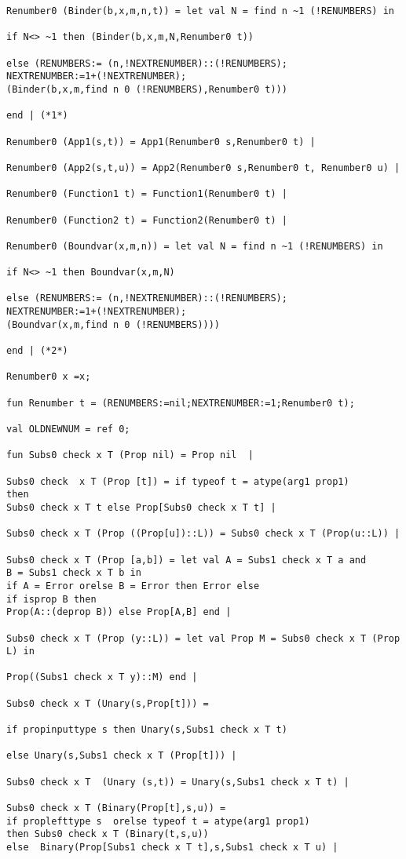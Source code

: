 \documentclass{article}
\begin{document}
{{\begin{verbatim}
Renumber0 (Binder(b,x,m,n,t)) = let val N = find n ~1 (!RENUMBERS) in

if N<> ~1 then (Binder(b,x,m,N,Renumber0 t))

else (RENUMBERS:= (n,!NEXTRENUMBER)::(!RENUMBERS);
NEXTRENUMBER:=1+(!NEXTRENUMBER);
(Binder(b,x,m,find n 0 (!RENUMBERS),Renumber0 t))) 

end | (*1*)

Renumber0 (App1(s,t)) = App1(Renumber0 s,Renumber0 t) |

Renumber0 (App2(s,t,u)) = App2(Renumber0 s,Renumber0 t, Renumber0 u) |

Renumber0 (Function1 t) = Function1(Renumber0 t) |

Renumber0 (Function2 t) = Function2(Renumber0 t) |

Renumber0 (Boundvar(x,m,n)) = let val N = find n ~1 (!RENUMBERS) in

if N<> ~1 then Boundvar(x,m,N)

else (RENUMBERS:= (n,!NEXTRENUMBER)::(!RENUMBERS);
NEXTRENUMBER:=1+(!NEXTRENUMBER);
(Boundvar(x,m,find n 0 (!RENUMBERS)))) 

end | (*2*)

Renumber0 x =x;

fun Renumber t = (RENUMBERS:=nil;NEXTRENUMBER:=1;Renumber0 t);

val OLDNEWNUM = ref 0;

fun Subs0 check x T (Prop nil) = Prop nil  |

Subs0 check  x T (Prop [t]) = if typeof t = atype(arg1 prop1)
then
Subs0 check x T t else Prop[Subs0 check x T t] |

Subs0 check x T (Prop ((Prop[u])::L)) = Subs0 check x T (Prop(u::L)) |

Subs0 check x T (Prop [a,b]) = let val A = Subs1 check x T a and
B = Subs1 check x T b in 
if A = Error orelse B = Error then Error else
if isprop B then
Prop(A::(deprop B)) else Prop[A,B] end |

Subs0 check x T (Prop (y::L)) = let val Prop M = Subs0 check x T (Prop L) in

Prop((Subs1 check x T y)::M) end |

Subs0 check x T (Unary(s,Prop[t])) =

if propinputtype s then Unary(s,Subs1 check x T t)

else Unary(s,Subs1 check x T (Prop[t])) |

Subs0 check x T  (Unary (s,t)) = Unary(s,Subs1 check x T t) |

Subs0 check x T (Binary(Prop[t],s,u)) =
if proplefttype s  orelse typeof t = atype(arg1 prop1)
then Subs0 check x T (Binary(t,s,u)) 
else  Binary(Prop[Subs1 check x T t],s,Subs1 check x T u) |


\end{verbatim}}}
\end{document}
